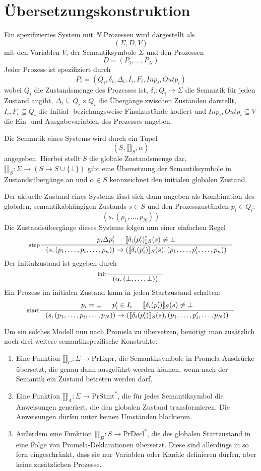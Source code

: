 \section{Übersetzungskonstruktion}
Ein spezifiziertes System mit $N$ Prozessen wird dargestellt als
\[ (\Sigma,D,V) \]
mit den Variablen $V$, der Semantiksymbole $\Sigma$ und den Prozessen
\[ D = (P_1,\dots,P_N) \]
Jeder Prozess ist spezifiziert durch
\[ P_i = (Q_i,\delta_i,\Delta_i,I_i,F_i,Inp_i,Outp_i) \]
wobei $Q_i$ die Zustandsmenge des Prozesses ist, $\delta_i: Q_i\rightarrow \Sigma$ die Semantik für jeden Zustand angibt, $\Delta_i\subseteq Q_i\times Q_i$ die Übergänge zwischen Zuständen darstellt, $I_i,F_i\subseteq Q_i$ die Initial- beziehungsweise Finalzustände kodiert und $Inp_i,Outp_i\subseteq V$ die Ein- und Ausgabevariablen des Prozesses angeben.

Die Semantik eines Systems wird durch ein Tupel
\[ (S,\llbracket \rrbracket_S,\alpha) \]
angegeben.
Hierbei stellt $S$ die globale Zustandsmenge dar, $\llbracket \rrbracket_S:\Sigma\rightarrow (S\rightarrow S\cup \{\bot\})$ gibt eine Übersetzung der Semantiksymbole in Zustandsübergänge an und $\alpha\in S$ kennzeichnet den initialen globalen Zustand.

Der aktuelle Zustand eines Systems lässt sich dann angeben als Kombination des globalen, semantikabhängigen Zustands $s\in S$ und den Prozesszuständen $p_i\in Q_i$:
\[ (s,(p_1,\dots,p_N)) \]
Die Zustandsübergänge dieses Systems folgen nun einer einfachen Regel
\[ \inference[step]{p_i\Delta p_i'&\llbracket \delta_i(p_i')\rrbracket_S(s)\neq\bot}{(s,(p_1,\dots,p_i,\dots,p_n))\rightarrow (\llbracket\delta_i(p_i')\rrbracket_S(s),(p_1,\dots,p_i',\dots,p_n))} \]
Der Initialzustand ist gegeben durch
\[ \inference[init]{}{(\alpha,(\bot,\dots,\bot))} \]
Ein Prozess im initialen Zustand kann in jeden Startzustand schalten:
\[ \inference[start]{p_i=\bot&p_i'\in I_i&\llbracket \delta_i(p_i')\rrbracket_S(s)\neq\bot}{(s,(p_1,\dots,p_i,\dots,p_N))\rightarrow (\llbracket \delta_i(p_i')\rrbracket_S(s),(p_1,\dots,p_i',\dots,p_N))} \]

Um ein solches Modell nun nach Promela zu übersetzen, benötigt man zusätzlich noch drei weitere semantikspezifische Konstrukte:
\begin{enumerate}
\item Eine Funktion $\llbracket\rrbracket_C : \Sigma\rightarrow \textrm{PrExpr}$, die Semantiksymbole in Promela-Ausdrücke übersetzt, die genau dann ausgeführt werden können, wenn nach der Semantik ein Zustand betreten werden darf.
\item Eine Funktion $\llbracket\rrbracket_A : \Sigma\rightarrow \textrm{PrStmt}^{*}$, die für jedes Semantiksymbol die Anweisungen generiert, die den globalen Zustand transformieren.
  Die Anweisungen dürfen unter keinen Umständen blockieren.
\item Außerdem eine Funktion $\llbracket\rrbracket_D : S\rightarrow \textrm{PrDecl}^{*}$, die des globalen Startzustand in eine Folge von Promela-Deklarationen übersetzt.
  Diese sind allerdings in so fern eingeschränkt, dass sie nur Variablen oder Kanäle definieren dürfen, aber keine zusätzlichen Prozesse.
\end{enumerate}

